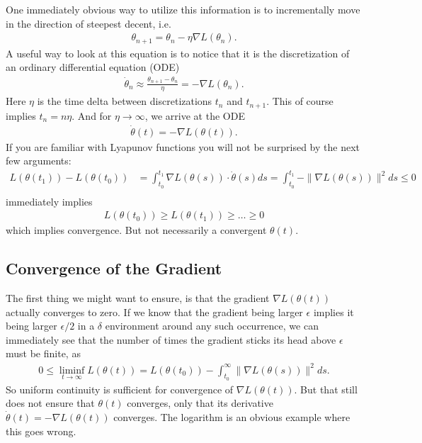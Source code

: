 One immediately obvious way to utilize this information is to
incrementally move in the direction of steepest decent, i.e.
%
\begin{align*}
	\theta_{n+1} = \theta_n - \eta\nabla L(\theta_n).
\end{align*}
%
A useful way to look at this equation is to notice that it is the
discretization of an ordinary differential equation (ODE)
%
\begin{align*}
	\dot{\theta}_n \approx \frac{\theta_{n+1} - \theta_n}{\eta}
	= - \nabla L(\theta_n).
\end{align*}
%
Here \(\eta\) is the time delta between discretizations \(t_n\) and \(t_{n+1}\).
This of course implies \(t_n = n\eta\). And for \(\eta\to\infty\), we arrive
at the ODE
%
\begin{align*}
	\dot{\theta}(t) = -\nabla L(\theta(t)).
\end{align*}
%
If you are familiar with Lyapunov functions you will not be surprised by the next
few arguments:
%
\begin{align*}
	L(\theta(t_1)) - L(\theta(t_0))
	&= \int_{t_0}^{t_1} \nabla L(\theta(s)) \cdot \dot{\theta}(s) ds
	= \int_{t_0}^{t_1} -\|\nabla L(\theta(s))\|^2 ds
	\le 0\\
\end{align*}
%
immediately implies
\begin{align*}
	L(\theta(t_0)) \ge L(\theta(t_1)) \ge \dots \ge 0
\end{align*}
which implies convergence. But not necessarily a convergent \(\theta(t)\).

\subsection{Convergence of the Gradient}

The first thing we might want to ensure, is that the gradient \(\nabla L(\theta(t))\)
actually converges to zero. If we know that the gradient being larger \(\epsilon\)
implies it being larger \(\epsilon/2\) in a \(\delta\) environment around any
such occurrence, we can immediately see that the number of times the gradient
sticks its head above \(\epsilon\) must be finite, as
%
\begin{align}\label{bounded gradient integral}
	0 \le \liminf_{t\to\infty} L(\theta(t))
	=  L(\theta(t_0)) - \int_{t_0}^\infty \|\nabla L(\theta(s))\|^2 ds.
\end{align}
%
So uniform continuity is sufficient for convergence of \(\nabla L(\theta(t))\).
But that still does not ensure that \(\theta(t)\) converges, only that its
derivative \(\dot{\theta}(t) = -\nabla L(\theta(t))\) converges. The logarithm
is an obvious example where this goes wrong.

